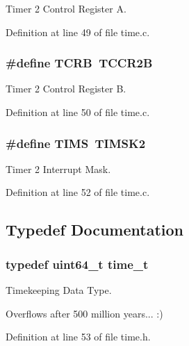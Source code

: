 Timer 2 Control Register A. 



Definition at line 49 of file time.\-c.

\hypertarget{group__time_ga717594a5c0d5875c9e22aaa23c0649c5}{
\subsubsection[{T\-C\-R\-B}]{\setlength{\rightskip}{0pt plus 5cm}\#define T\-C\-R\-B~T\-C\-C\-R2\-B}}\label{group__time_ga717594a5c0d5875c9e22aaa23c0649c5}


Timer 2 Control Register B. 



Definition at line 50 of file time.\-c.

\hypertarget{group__time_ga0d40e996ea66a3ab8d42039bebb09978}{
\subsubsection[{T\-I\-M\-S}]{\setlength{\rightskip}{0pt plus 5cm}\#define T\-I\-M\-S~T\-I\-M\-S\-K2}}\label{group__time_ga0d40e996ea66a3ab8d42039bebb09978}


Timer 2 Interrupt Mask. 



Definition at line 52 of file time.\-c.



\subsection{Typedef Documentation}
\hypertarget{group__time_ga02ad034d26db2c14b7e295b0c50fc11d}{
\subsubsection[{time\-\_\-t}]{\setlength{\rightskip}{0pt plus 5cm}typedef uint64\-\_\-t {\bf time\-\_\-t}}}\label{group__time_ga02ad034d26db2c14b7e295b0c50fc11d}


Timekeeping Data Type. 

Overflows after 500 million years... \-:) 

Definition at line 53 of file time.\-h.



